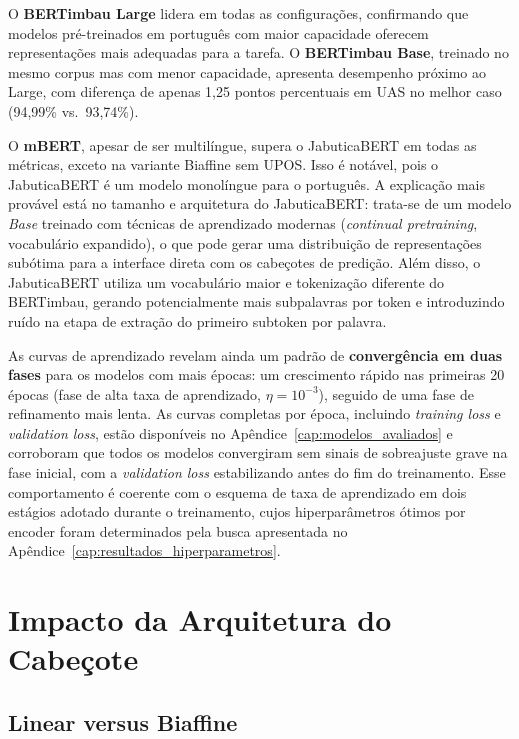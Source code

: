 O \textbf{BERTimbau Large} lidera em todas as configurações, confirmando que modelos pré-treinados
em português com maior capacidade oferecem representações mais adequadas para a tarefa. O
\textbf{BERTimbau Base}, treinado no mesmo corpus mas com menor capacidade, apresenta desempenho
próximo ao Large, com diferença de apenas 1,25 pontos percentuais em UAS no melhor caso
(94,99\% vs.\ 93,74\%).

O \textbf{mBERT}, apesar de ser multilíngue, supera o JabuticaBERT em todas as métricas, exceto
na variante Biaffine sem UPOS. Isso é notável, pois o JabuticaBERT é um modelo monolíngue para o
português. A explicação mais provável está no tamanho e arquitetura do JabuticaBERT: trata-se de
um modelo \textit{Base} treinado com técnicas de aprendizado modernas (\textit{continual
pretraining}, vocabulário expandido), o que pode gerar uma distribuição de representações
subótima para a interface direta com os cabeçotes de predição. Além
disso, o JabuticaBERT utiliza um vocabulário maior e tokenização diferente do BERTimbau,
gerando potencialmente mais subpalavras por token e introduzindo ruído na etapa de extração
do primeiro subtoken por palavra.

As curvas de aprendizado revelam ainda um padrão de \textbf{convergência em duas fases} para os
modelos com mais épocas: um crescimento rápido nas primeiras 20 épocas (fase de alta taxa de
aprendizado, $\eta = 10^{-3}$), seguido de uma fase de refinamento mais lenta. As curvas
completas por época, incluindo \textit{training loss} e \textit{validation loss}, estão
disponíveis no Apêndice~\ref{cap:modelos_avaliados} e corroboram que todos os modelos
convergiram sem sinais de sobreajuste grave na fase inicial, com a \textit{validation loss}
estabilizando antes do fim do treinamento. Esse comportamento é coerente com o esquema de
taxa de aprendizado em dois estágios adotado durante o treinamento, cujos hiperparâmetros
ótimos por encoder foram determinados pela busca apresentada no
Apêndice~\ref{cap:resultados_hiperparametros}.

\section{Impacto da Arquitetura do Cabeçote}
\label{sec:arquitetura}

\subsection{Linear versus Biaffine}

